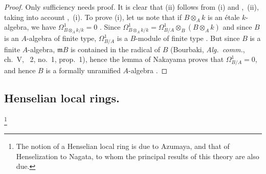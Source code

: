 \begin{proof}
Only sufficiency needs proof.
It is clear that (ii) follows from (i) and ,~(ii), taking into account ,~(i).
To prove (i), let us note that if $B\otimes_A k$ is an \'etale $k$-algebra, we have $\Omega^1_{B\otimes_A k/k}=0$ .
Since $\Omega^1_{B\otimes_A k/k}=\Omega^1_{B/A}\otimes_B(B\otimes_A k)$  and since $B$ is an $A$-algebra of finite type, $\Omega^1_{B/A}$ is a $B$-module of finite type .
But since $B$ is a finite $A$-algebra, $\mathfrak{m}B$ is contained in the radical of $B$ (Bourbaki, \emph{Alg.\ comm.}, ch.~V, \textsection~2, no.~1, prop.~1), hence the lemma of Nakayama proves that $\Omega^1_{B/A}=0$, and hence $B$ is a formally unramified $A$-algebra .
\end{proof}


\subsection{Henselian local rings.}
\label{subsection:IV.18.5}
\footnote{The notion of a Henselian local ring is due to Azumaya, and that of Henselization to Nagata, to whom the principal results of this theory are also due.}

